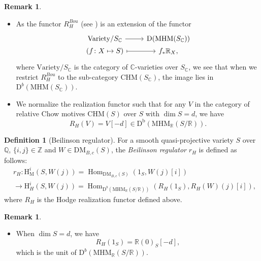 \documentclass[11pt, a4paper]{amsart}
\theoremstyle{plain}
\theoremstyle{definition}
\newtheorem{definition}[theorem]{Definition}
\newtheorem{remark}[theorem]{Remark}
\numberwithin{equation}{section}
\def\CC{\mathbb{C}}
\def\QQ{\mathbb{Q}}
\def\RR{\mathbb{R}}
\def\ZZ{\mathbb{Z}}
\DeclareMathOperator{\Hom}{Hom}
\begin{document}
 \begin{remark}
     \begin{itemize}
         \item As the functor $R_{H}^{Bou}$ (see \cite[Page 1]{Bouli22}) is an extension of the functor 
               \[
                    \begin{tikzcd}[row sep = 0]
                        \mathrm{Variety} / S_{\CC} \ar[r] & \mathrm{D}(\mathrm{MHM}(S_{\CC})) \\
                            (f \colon X \mapsto S) \ar[r, mapsto] & f_{*} \RR_{X}, 
                    \end{tikzcd}
               \]
               where $\mathrm{Variety} / S_{\CC}$ is the category of $\CC$-varieties over $S_{\CC}$, we see that when we restrict $R_{H}^{Bou}$ to the sub-category $\mathrm{CHM}(S_{\CC})$, the image lies in $\mathrm{D}^{b}(\mathrm{MHM}(S_{\CC}))$. 
         \item We normalize the realization functor such that for any $V$ in the category of relative Chow motives $\mathrm{CHM}(S)$ over $S$ with $\dim S = d$, we have 
         \begin{equation*}
             R_{H}(V) = V[-d] \in \mathrm{D}^{\mathrm{b}}(\mathrm{MHM}_{\RR}(S/\RR)). 
         \end{equation*}
               
     \end{itemize}
 \end{remark}

 \begin{definition}[Beilinson regulator]
 \label{def: Beilinson regulator}
     For a smooth quasi-projective variety $S$ over $\QQ$, $\{i, j\} \in \ZZ$ and $W \in \mathrm{DM}_{B,c}(S)$, the \textit{Beilinson regulator} $r_H$ is defined as follows: 
     \begin{align*}
         & r_{H} \colon \mathrm{H}_{\mathrm{M}}^{i}(S,W(j)) = \Hom_{\mathrm{DM}_{B,c}(S)}(1_{S},W(j)[i]) \\ 
         & \rightarrow \mathrm{H}^{i}_{H}(S, W(j)) = \Hom_{\mathrm{D}^{b}(\mathrm{MHM}_{\RR}(S/\RR))}(R_{H}(1_{S}), R_H(W)(j)[i]),
     \end{align*}
     where $R_{H}$ is the Hodge realization functor defined above. 
 \end{definition}

 \begin{remark}
     \begin{itemize}
         \item When $\dim S = d$, we have 
         \begin{equation*}
             R_{H}(1_{S}) = \RR(0)_{S}[-d], 
         \end{equation*}
         which is the unit of $\mathrm{D}^{b}(\mathrm{MHM}_{\RR}(S/\RR))$. 
     \end{itemize}
 \end{remark}
\end{document}
